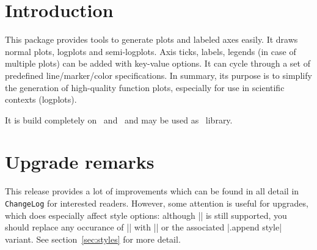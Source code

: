 \section{Introduction}
This package provides tools to generate plots and labeled axes easily. It draws normal plots, logplots and semi-logplots. Axis ticks, labels, legends (in case of multiple plots) can be added with key-value options. It can cycle through a set of predefined line/marker/color specifications. In summary, its purpose is to simplify the generation of high-quality function plots, especially for use in scientific contexts (logplots).

It is build completely on \Tikz\ and \PGF\ and may be used as \Tikz\ library. 

\section{Upgrade remarks}
This release provides a lot of improvements which can be found in all detail in \texttt{ChangeLog} for interested readers. However, some attention is useful for upgrades, which does especially affect style options: although |\tikzstyle| is still supported, you should replace any occurance of |\tikzstyle| with || or the associated |.append style| variant. See section~\ref{sec:styles} for more detail.

%
%
%
%

\printindex



